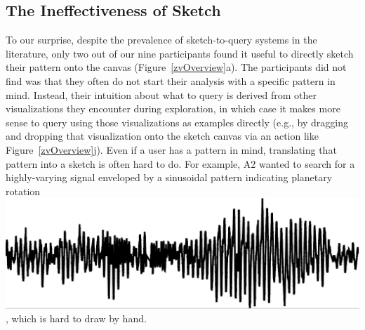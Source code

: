 \subsection{The Ineffectiveness of Sketch}
\par To our surprise,
despite the prevalence of sketch-to-query
systems in the literature,  only two out of our nine participants
found it useful to directly
sketch their pattern onto the canvas (Figure~\ref{zvOverview}a). %
The  participants
did not find  was that
they often do not start their analysis with a specific pattern in mind.
Instead, their intuition about what to query is derived
from other visualizations they encounter
during exploration, in which case it makes
more sense to query using those visualizations
as examples directly (e.g., by dragging and dropping
that visualization onto the sketch canvas via an action like
Figure~\ref{zvOverview}j).
Even if a user has a pattern in mind,
translating that pattern into a sketch is often hard
to do. For example,
A2 wanted to search for a highly-varying signal
enveloped by a sinusoidal pattern indicating
planetary rotation \includegraphics[width=2\baselineskip,keepaspectratio]{figures/impossible_sketch.png}, which is hard to draw by hand.
